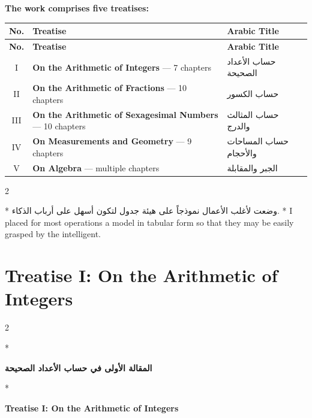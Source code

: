 \documentclass[11pt,a4paper]{article}
\newcommand{\ar}[1]{\arabicfont\beginR #1\endR}
\newenvironment{bilingual}{%
  \vspace{0.3em}%
  \begin{paracol}{2}%
}{%
  \end{paracol}%
  \vspace{0.3em}%
}
\begin{document}
\vspace{0.5cm}

\noindent\textbf{The work comprises five treatises:}

\begin{longtable}{|c|p{7cm}|p{5cm}|}
\hline
\textbf{No.} & \textbf{Treatise} & \textbf{Arabic Title} \\
\hline
\endfirsthead
\hline
\textbf{No.} & \textbf{Treatise} & \textbf{Arabic Title} \\
\hline
\endhead
I & \textbf{On the Arithmetic of Integers} --- 7 chapters & \ar{حساب الأعداد الصحيحة} \\
\hline
II & \textbf{On the Arithmetic of Fractions} --- 10 chapters & \ar{حساب الكسور} \\
\hline
III & \textbf{On the Arithmetic of Sexagesimal Numbers} --- 10 chapters & \ar{حساب المثالث والدرج} \\
\hline
IV & \textbf{On Measurements and Geometry} --- 9 chapters & \ar{حساب المساحات والأحجام} \\
\hline
V & \textbf{On Algebra} --- multiple chapters & \ar{الجبر والمقابلة} \\
\hline
\end{longtable}

\begin{bilingual}
\switchcolumn[0]*
\ar{وضعت لأغلب الأعمال نموذجاً على هيئة جدول لتكون أسهل على أرباب الذكاء.}
\switchcolumn[1]*
I placed for most operations a model in tabular form so that they may be
easily grasped by the intelligent.
\end{bilingual}
\clearpage


\section{Treatise I: On the Arithmetic of Integers}
\label{sec:treatise1}

\begin{bilingual}
\switchcolumn[0]*
\begin{center}
\textbf{\Large\color{chapcolor}\ar{المقالة الأولى في حساب الأعداد الصحيحة}}
\end{center}
\switchcolumn[1]*
\begin{center}
\textbf{\Large\color{chapcolor}Treatise I: On the Arithmetic of Integers}
\end{center}
\end{bilingual}
\end{document}
